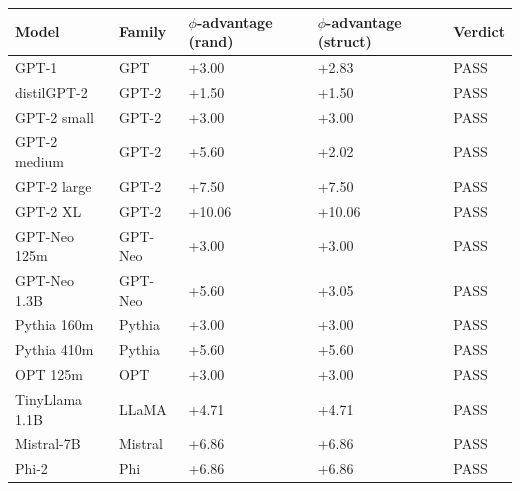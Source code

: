 \documentclass[12pt]{article}
\begin{document}
\begin{longtable}[]{@{}
  >{\raggedright\arraybackslash}p{}
  >{\raggedright\arraybackslash}p{}
  >{\raggedright\arraybackslash}p{}
  >{\raggedright\arraybackslash}p{}
  >{\raggedright\arraybackslash}p{}@{}}
\toprule\noalign{}
\begin{minipage}[b]{\linewidth}\raggedright
Model
\end{minipage} & \begin{minipage}[b]{\linewidth}\raggedright
Family
\end{minipage} & \begin{minipage}[b]{\linewidth}\raggedright
\(\phi\)-advantage (rand)
\end{minipage} & \begin{minipage}[b]{\linewidth}\raggedright
\(\phi\)-advantage (struct)
\end{minipage} & \begin{minipage}[b]{\linewidth}\raggedright
Verdict
\end{minipage} \\
\midrule\noalign{}
\endhead
\bottomrule\noalign{}
\endlastfoot
GPT-1 & GPT & +3.00 & +2.83 & PASS \\
distilGPT-2 & GPT-2 & +1.50 & +1.50 & PASS \\
GPT-2 small & GPT-2 & +3.00 & +3.00 & PASS \\
GPT-2 medium & GPT-2 & +5.60 & +2.02 & PASS \\
GPT-2 large & GPT-2 & +7.50 & +7.50 & PASS \\
GPT-2 XL & GPT-2 & +10.06 & +10.06 & PASS \\
GPT-Neo 125m & GPT-Neo & +3.00 & +3.00 & PASS \\
GPT-Neo 1.3B & GPT-Neo & +5.60 & +3.05 & PASS \\
Pythia 160m & Pythia & +3.00 & +3.00 & PASS \\
Pythia 410m & Pythia & +5.60 & +5.60 & PASS \\
OPT 125m & OPT & +3.00 & +3.00 & PASS \\
TinyLlama 1.1B & LLaMA & +4.71 & +4.71 & PASS \\
Mistral-7B & Mistral & +6.86 & +6.86 & PASS \\
Phi-2 & Phi & +6.86 & +6.86 & PASS \\
\end{longtable}
\end{document}
